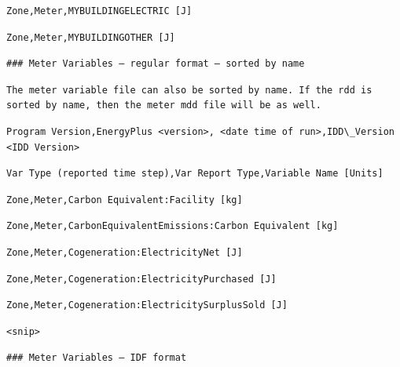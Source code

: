 \begin{lstlisting}
Zone,Meter,MYBUILDINGELECTRIC [J]
\end{lstlisting}

\begin{lstlisting}
Zone,Meter,MYBUILDINGOTHER [J]
\end{lstlisting}

\begin{lstlisting}
### Meter Variables – regular format – sorted by name
\end{lstlisting}

\begin{lstlisting}
The meter variable file can also be sorted by name. If the rdd is sorted by name, then the meter mdd file will be as well.
\end{lstlisting}

\begin{lstlisting}
Program Version,EnergyPlus <version>, <date time of run>,IDD\_Version <IDD Version>
\end{lstlisting}

\begin{lstlisting}
Var Type (reported time step),Var Report Type,Variable Name [Units]
\end{lstlisting}

\begin{lstlisting}
Zone,Meter,Carbon Equivalent:Facility [kg]
\end{lstlisting}

\begin{lstlisting}
Zone,Meter,CarbonEquivalentEmissions:Carbon Equivalent [kg]
\end{lstlisting}

\begin{lstlisting}
Zone,Meter,Cogeneration:ElectricityNet [J]
\end{lstlisting}

\begin{lstlisting}
Zone,Meter,Cogeneration:ElectricityPurchased [J]
\end{lstlisting}

\begin{lstlisting}
Zone,Meter,Cogeneration:ElectricitySurplusSold [J]
\end{lstlisting}

\begin{lstlisting}
<snip>
\end{lstlisting}

\begin{lstlisting}
### Meter Variables – IDF format
\end{lstlisting}

